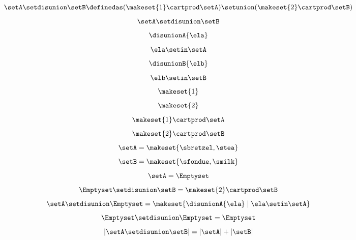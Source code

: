\begin{forslides}
    \begin{equation}\label{eq:slides_session2_59}
        \setA \setdisunion \setB \definedas (  \makeset{ 1 } \cartprod \setA) \setunion ( \makeset{2}  \cartprod \setB)
    \end{equation}
    \begin{equation}\label{eq:slides_session2_60}
        \setA \setdisunion \setB
    \end{equation}
    \begin{equation}\label{eq:slides_session2_61}
        \disunionA{\ela}
    \end{equation}
    \begin{equation}\label{eq:slides_session2_62}
        \ela \setin\setA
    \end{equation}
    \begin{equation}\label{eq:slides_session2_63}
        \disunionB{\elb}
    \end{equation}
    \begin{equation}\label{eq:slides_session2_64}
        \elb \setin\setB
    \end{equation}
    \begin{equation}\label{eq:slides_session2_65}
        \makeset{ 1 }
    \end{equation}
    \begin{equation}\label{eq:slides_session2_66}
        \makeset{2}
    \end{equation}
    \begin{equation}\label{eq:slides_session2_67}
        \makeset{ 1 }  \cartprod \setA
    \end{equation}
    \begin{equation}\label{eq:slides_session2_68}
        \makeset{2}  \cartprod \setB
    \end{equation}
    \begin{equation}\label{eq:slides_session2_69}
        \setA=\makeset{\sbretzel, \stea}
    \end{equation}
    \begin{equation}\label{eq:slides_session2_70}
        \setB=\makeset{\sfondue, \smilk}
    \end{equation}
    \begin{equation}\label{eq:slides_session2_71}
        \setA = \Emptyset
    \end{equation}
    \begin{equation}\label{eq:slides_session2_72}
        \Emptyset \setdisunion \setB =  \makeset{2} \cartprod \setB
    \end{equation}
    \begin{equation}\label{eq:slides_session2_73}
        \setA \setdisunion \Emptyset =  \makeset{ \disunionA{\ela} \mid \ela \setin\setA }
    \end{equation}
    \begin{equation}\label{eq:slides_session2_74}
        \Emptyset \setdisunion \Emptyset = \Emptyset
    \end{equation}
    \begin{equation}\label{eq:slides_session2_75}
        \vert \setA \setdisunion \setB \vert = \vert \setA \vert + \vert \setB \vert
    \end{equation}


\end{forslides}
